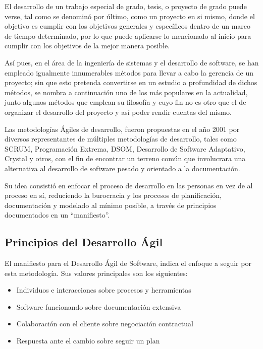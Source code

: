 El desarrollo de un trabajo especial de grado, tesis, o proyecto de grado puede verse, tal como se denominó por último, como un proyecto en si mismo, donde el objetivo es cumplir con los objetivos generales y específicos dentro de un marco de tiempo determinado, por lo que puede aplicarse lo mencionado al inicio para cumplir con los objetivos de la mejor manera posible.

Así pues, en el área de la ingeniería de sistemas y el desarrollo de software, se han empleado igualmente innumerables métodos para llevar a cabo la gerencia de un proyecto; sin que esto pretenda convertirse en un estudio a profundidad de dichos métodos, se nombra a continuación uno de los más populares en la actualidad, junto algunos métodos que emplean su filosofía y cuyo fin no es otro que el de organizar el desarrollo del proyecto y así poder rendir cuentas del mismo.

Las metodologías Ágiles de desarrollo, fueron propuestas en el año 2001 por diversos representantes de múltiples metodologías de desarrollo, tales como SCRUM, Programación Extrema, DSOM, Desarrollo de Software Adaptativo, Crystal y otros, con el fin de encontrar un terreno común que involucrara una alternativa al desarrollo de software pesado y orientado a la documentación.

Su idea consistió en enfocar el proceso de desarrollo en las personas en vez de al proceso en sí, reduciendo la burocracia y los procesos de planificación, documentación y modelado al mínimo posible, a través de principios documentados en un ``manifiesto''.

\subsection{Principios del Desarrollo Ágil}

El manifiesto para el Desarrollo Ágil de Software, indica el enfoque a seguir por esta metodología. Sus valores principales son los siguientes:

\begin{itemize}
	\itemsep1pt \parskip1pt 
	\item Individuos e interacciones sobre procesos y herramientas
	\item Software funcionando sobre documentación extensiva
	\item Colaboración con el cliente sobre negociación contractual
	\item Respuesta ante el cambio sobre seguir un plan
\end{itemize}

